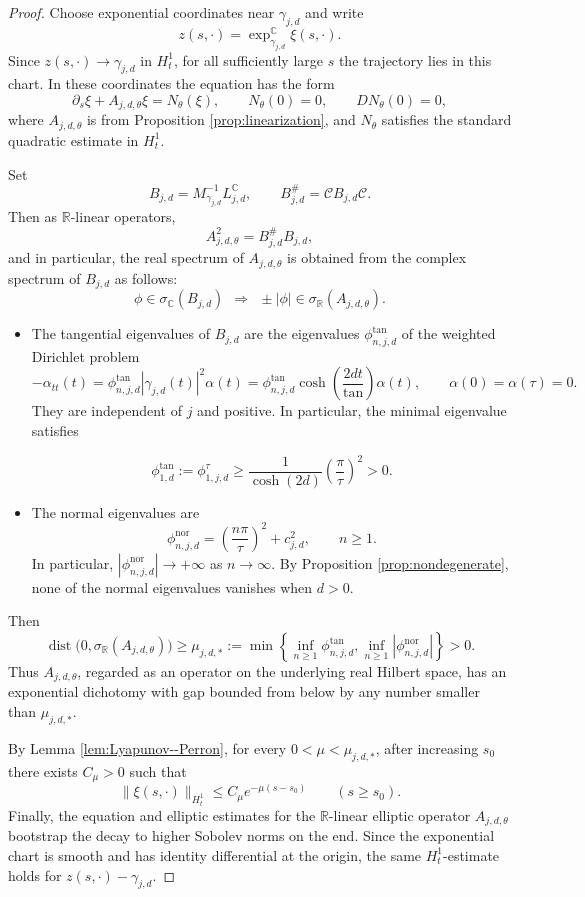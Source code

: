 \documentclass[11pt]{amsart}
\theoremstyle{plain}
\theoremstyle{definition}
\newcommand{\R}{\mathbb{R}}
\newcommand{\C}{\mathbb{C}}
\begin{document}
\begin{proof}
Choose exponential coordinates near $\gamma_{j,d}$ and write
\[
z(s,\cdot)=\exp_{\gamma_{j,d}}^{\C}\xi(s,\cdot).
\]
Since $z(s,\cdot)\to\gamma_{j,d}$ in $H^1_t$, for all sufficiently large
$s$ the trajectory lies in this chart. In these coordinates the equation
has the form
\[
\partial_s\xi+A_{j,d,\theta}\xi=N_{\theta}(\xi),\qquad
N_{\theta}(0)=0,\qquad DN_{\theta}(0)=0,
\]
where $A_{j,d,\theta}$ is from Proposition \ref{prop:linearization}, and $N_{\theta}$ satisfies the standard quadratic estimate in $H^1_t$.

Set
\[B_{j,d}=M_{\gamma_{j,d}}^{-1}L^{\C}_{j,d},\qquad B_{j,d}^{\#}=\mathcal{C}B_{j,d}\mathcal{C}.\]
Then as $\R$-linear operators,
\[A_{j,d,\theta}^2=B_{j,d}^{\#}B_{j,d},\]
and in particular, the real spectrum of $A_{j,d,\theta}$ is obtained from the complex spectrum of $B_{j,d}$ as follows:
\[\phi\in \sigma_{\C}(B_{j,d})~~\Rightarrow~~ \pm|\phi|\in \sigma_{\R}(A_{j,d,\theta}).
\]

\begin{itemize}
    \item The tangential eigenvalues of $B_{j,d}$ are the eigenvalues
$\phi^{\mathrm{tan}}_{n,j,d}$ of the weighted Dirichlet problem
\[
-\alpha_{tt}(t)=\phi^{\mathrm{tan}}_{n,j,d}
|\gamma_{j,d}(t)|^2\alpha(t)=\phi_{n,j,d}^{\tan}\cosh\left(\frac{2dt}{\tan}\right)\alpha(t),
\qquad\alpha(0)=\alpha(\tau)=0.
\]
They are independent of $j$ and positive. In particular, the minimal eigenvalue satisfies

\[\phi_{1,d}^{\tan}:=\phi_{1,j,d}^{\tau}\ge\frac{1}{\cosh(2d)}\left(\frac{\pi}{\tau}\right)^2>0.\]
\item The normal eigenvalues are
\[
\phi^{\mathrm{nor}}_{n,j,d}=
\left(\frac{n\pi}{\tau}\right)^2+c_{j,d}^2,
\qquad n\ge1.
\]
In particular, $|\phi^{\mathrm{nor}}_{n,j,d}|\rightarrow+\infty$ as $n\rightarrow\infty$. By Proposition \ref{prop:nondegenerate}, none of the normal eigenvalues vanishes when $d>0$. 
\end{itemize}

Then
\[
\operatorname{dist}\bigl(0,\sigma_{\R}(A_{j,d,\theta})\bigr)\ge \mu_{j,d,*}:=\min\left\{\inf_{n\ge1}\phi^{\mathrm{tan}}_{n,j,d},
\inf_{n\ge1}\left|\phi^{\mathrm{nor}}_{n,j,d}\right|\right\}>0.
\]
Thus $A_{j,d,\theta}$, regarded as an operator on the underlying real
Hilbert space, has an exponential dichotomy with gap bounded from
below by any number smaller than $\mu_{j,d,*}$.

By Lemma \ref{lem:Lyapunov--Perron}, for every
$0<\mu<\mu_{j,d,*}$, after increasing $s_0$ there exists
$C_\mu>0$ such that
\[
\|\xi(s,\cdot)\|_{H^1_t}\le C_\mu e^{-\mu(s-s_0)}\qquad(s\ge s_0).
\]
Finally, the equation and elliptic estimates for the $\R$-linear elliptic
operator $A_{j,d,\theta}$ bootstrap the decay to higher Sobolev norms on the end. Since the
exponential chart is smooth and has identity differential at the origin, the
same $H^1_t$-estimate holds for
$z(s,\cdot)-\gamma_{j,d}$. 
\end{proof}
\end{document}
